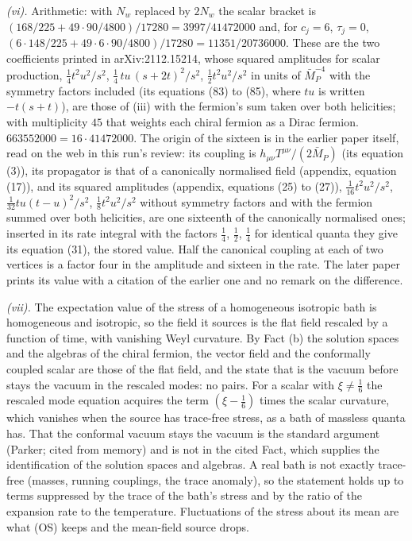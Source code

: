 \emph{(vi).} Arithmetic: with $N_{w}$ replaced by $2N_{w}$ the scalar bracket is $(168/225 + 49 \cdot 90/4800)/17280 = 3997/41472000$ and, for $c_{j} = 6$, $\tau_{j} = 0$, $(6 \cdot 148/225 + 49 \cdot 6 \cdot 90/4800)/17280 = 11351/20736000$. These are the two coefficients printed in arXiv:2112.15214, whose squared amplitudes for scalar production, $\tfrac14 t^{2}u^{2}/s^{2}$, $\tfrac14\,tu\,(s + 2t)^{2}/s^{2}$, $\tfrac12 t^{2}u^{2}/s^{2}$ in units of $\bar{M}_{P}^{-4}$ with the symmetry factors included (its equations (83) to (85), where $tu$ is written $-t(s+t)$), are those of (iii) with the fermion's sum taken over both helicities; with multiplicity $45$ that weights each chiral fermion as a Dirac fermion. $663552000 = 16 \cdot 41472000$. The origin of the sixteen is in the earlier paper itself, read on the web in this run's review: its coupling is $h_{\mu\nu}T^{\mu\nu}/(2\bar{M}_{P})$ (its equation (3)), its propagator is that of a canonically normalised field (appendix, equation (17)), and its squared amplitudes (appendix, equations (25) to (27)), $\tfrac1{16}t^{2}u^{2}/s^{2}$, $\tfrac1{32}tu(t-u)^{2}/s^{2}$, $\tfrac18 t^{2}u^{2}/s^{2}$ without symmetry factors and with the fermion summed over both helicities, are one sixteenth of the canonically normalised ones; inserted in its rate integral with the factors $\tfrac14$, $\tfrac12$, $\tfrac14$ for identical quanta they give its equation (31), the stored value. Half the canonical coupling at each of two vertices is a factor four in the amplitude and sixteen in the rate. The later paper prints its value with a citation of the earlier one and no remark on the difference.

\emph{(vii).} The expectation value of the stress of a homogeneous isotropic bath is homogeneous and isotropic, so the field it sources is the flat field rescaled by a function of time, with vanishing Weyl curvature. By Fact (b) the solution spaces and the algebras of the chiral fermion, the vector field and the conformally coupled scalar are those of the flat field, and the state that is the vacuum before stays the vacuum in the rescaled modes: no pairs. For a scalar with $\xi \neq \tfrac16$ the rescaled mode equation acquires the term $(\xi - \tfrac16)$ times the scalar curvature, which vanishes when the source has trace-free stress, as a bath of massless quanta has. That the conformal vacuum stays the vacuum is the standard argument (Parker; cited from memory) and is not in the cited Fact, which supplies the identification of the solution spaces and algebras. A real bath is not exactly trace-free (masses, running couplings, the trace anomaly), so the statement holds up to terms suppressed by the trace of the bath's stress and by the ratio of the expansion rate to the temperature. Fluctuations of the stress about its mean are what (OS) keeps and the mean-field source drops.

